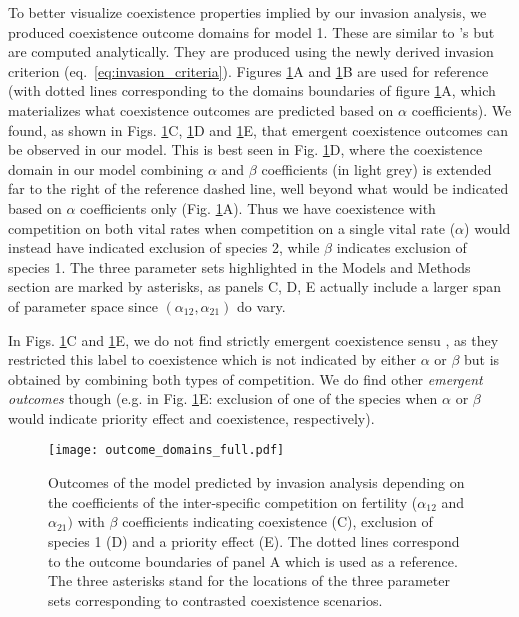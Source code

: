 \documentclass{article}
\begin{document}
To better visualize coexistence properties implied by our invasion analysis, we produced coexistence outcome domains for model 1. These are similar to \citet{moll2008competition}'s but are computed analytically.
They are produced using the newly derived invasion criterion (eq.~\ref{eq:invasion_criteria}). Figures \ref{fig:outcome_prediction}A and \ref{fig:outcome_prediction}B are used for reference (with dotted lines corresponding to the domains boundaries of figure \ref{fig:outcome_prediction}A, which materializes what coexistence outcomes are predicted based on $\alpha$ coefficients). We found, as shown in Figs. \ref{fig:outcome_prediction}C, \ref{fig:outcome_prediction}D and \ref{fig:outcome_prediction}E, that emergent coexistence outcomes can be observed in our model. This is best seen in Fig. \ref{fig:outcome_prediction}D, where the coexistence domain in our model combining $\alpha$ and $\beta$ coefficients (in light grey) is extended far to the right of the reference dashed line, well beyond what would be indicated based on $\alpha$ coefficients only (Fig. \ref{fig:outcome_prediction}A). Thus we have coexistence with competition on both vital rates when competition on a single vital rate ($\alpha$) would instead have indicated exclusion of species 2, while $\beta$ indicates exclusion of species 1. The three parameter sets highlighted in the Models and Methods section are marked by asterisks, as panels C, D, E actually include a larger span of parameter space since $(\alpha_{12},\alpha_{21})$ do vary.

In Figs. \ref{fig:outcome_prediction}C and \ref{fig:outcome_prediction}E,
we do not find strictly emergent coexistence sensu \citet{moll2008competition}, as they restricted this label to coexistence which is not indicated by either $\alpha$ or $\beta$ but is obtained by combining both types of competition. We do find other \textit{emergent outcomes} though (e.g. in Fig. \ref{fig:outcome_prediction}E: exclusion of one of the species when $\alpha$ or $\beta$ would indicate priority effect and coexistence, respectively). 


\begin{figure}[H]
    \centering
    \texttt{[image: outcome\_domains\_full.pdf]}
    \caption{Outcomes of the model predicted by invasion analysis depending on the coefficients of the inter-specific competition on fertility ($\alpha_{12}$ and $\alpha_{21})$ with $\beta$ coefficients indicating coexistence (C), exclusion of species 1 (D) and a priority effect (E). The dotted lines correspond to the outcome boundaries of panel A which is used as a reference. The three asterisks stand for the locations of the three parameter sets corresponding to contrasted coexistence scenarios.}
    \label{fig:outcome_prediction}
\end{figure}
\end{document}
